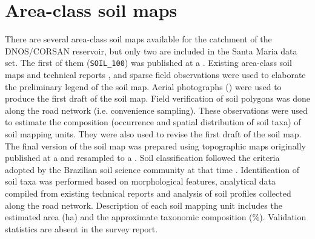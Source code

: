 % 
% 
\tocless\section{Area-class soil maps}
\label{sec:covar-data-soil-maps}

There are several area-class soil maps available for the catchment of the DNOS/CORSAN reservoir, but 
only two are included in the Santa Maria data set. The first of them (\texttt{SOIL\_100}) was 
published at a  \cite{AzolinEtAl1988}. Existing area-class soil maps and technical 
reports \cite{Brasil1973,Azolin1977,MacielEtAl1987a,MacielEtAl1987,AbraoEtAl1988}, and sparse field 
observations were used to elaborate the preliminary legend of the soil map. Aerial photographs 
() were used to produce the first draft of the soil map. Field verification of soil 
polygons was done along the road network (i.e. convenience sampling). These observations were used 
to estimate the composition (occurrence and spatial distribution of soil taxa) of soil mapping 
units. They were also used to revise the first draft of the soil map. The final version of the soil 
map was prepared using topographic maps originally published at a  and resampled to a 
. Soil classification followed the criteria adopted by the Brazilian soil science 
community at that time \cite{Brasil1973,CamargoEtAl1982,Carvalho1982,LemosEtAl1982,OlmosEtAl1982}. 
Identification of soil taxa was performed based on morphological features, analytical data compiled 
from existing technical reports and analysis of soil profiles collected along the road network. 
Description of each soil mapping unit includes the estimated area (\si{\hectare}) and the 
approximate taxonomic composition (\si{\percent}). Validation statistics are absent in the survey 
report.

